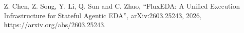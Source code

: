Z. Chen, Z. Song, Y. Li, Q. Sun and C. Zhuo,
``FluxEDA: A Unified Execution Infrastructure for Stateful Agentic EDA'',
arXiv:2603.25243, 2026,
\url{https://arxiv.org/abs/2603.25243}.
